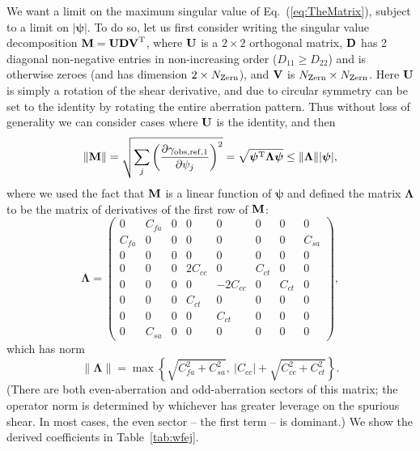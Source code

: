 \documentclass[usenatbib]{mnras}
\begin{document}
We want a limit on the maximum singular value of
Eq.~(\ref{eq:TheMatrix}), subject to a limit on
$|{\boldsymbol\psi}|$. To do so, let us first consider writing the
singular value decomposition ${\bf M} = {\bf UDV}^{\rm T}$, where
${\bf U}$ is a $2\times 2$ orthogonal matrix, ${\bf D}$ has 2 diagonal
non-negative entries in non-increasing order ($D_{11}\ge D_{22}$) and
is otherwise zeroes (and has dimension $2\times N_{\rm Zern}$), and
${\bf V}$ is $N_{\rm Zern}\times N_{\rm Zern}$. Here ${\bf U}$ is
simply a rotation of the shear derivative, and due to circular
symmetry can be set to the identity by rotating the entire aberration
pattern. Thus without loss of generality we can consider cases where
${\bf U}$ is the identity, and then
\begin{equation}
\lVert{\bf M} \rVert = \sqrt{ \sum_j \left(\frac{\partial \gamma_{{\rm obs,ref},1}}{\partial\psi_j} \right)^2 }
= \sqrt{ {\boldsymbol\psi}^{\rm T} {\boldsymbol\Lambda}{\boldsymbol\psi} }
\le \lVert{\boldsymbol\Lambda} \rVert |{\boldsymbol\psi}|,
\end{equation}
where we used the fact that ${\bf M}$ is a linear function of ${\boldsymbol\psi}$ and defined the matrix ${\boldsymbol\Lambda}$ to be the matrix of derivatives of the first row of ${\bf M}$:
\begin{equation}
{\boldsymbol\Lambda} = \left( \begin{array}{cccccccc}
0 & C_{fa} & 0 & 0 & 0 & 0 & 0 & 0 \\
C_{fa} & 0 & 0 & 0 & 0 & 0 & 0 & C_{sa} \\
0 & 0 & 0 & 0 & 0 & 0 & 0 & 0 \\
0 & 0 & 0 & 2C_{cc} & 0 & C_{ct} & 0 & 0 \\
0 & 0 & 0 & 0 & -2C_{cc} & 0 & C_{ct} & 0 \\
0 & 0 & 0 & C_{ct} & 0 & 0 & 0 & 0 \\
0 & 0 & 0 & 0 & C_{ct} & 0 & 0 & 0 \\
0 & C_{sa} & 0 & 0 & 0 & 0 & 0 & 0
\end{array} \right),
\label{eq:LambdaDef}
\end{equation}
which has norm
\begin{equation}
\lVert {\boldsymbol\Lambda} \rVert = \max \left\{
\sqrt{C_{fa}^2 + C_{sa}^2}, ~|C_{cc}|+\sqrt{C_{cc}^2+C_{ct}^2}
\right\}.
\label{eq:LambdaNorm}
\end{equation}
(There are both even-aberration and odd-aberration sectors of this
matrix; the operator norm is determined by whichever has greater
leverage on the spurious shear. In most cases, the even sector -- the
first term -- is dominant.) We show the derived coefficients in Table~\ref{tab:wfej}.
\end{document}
